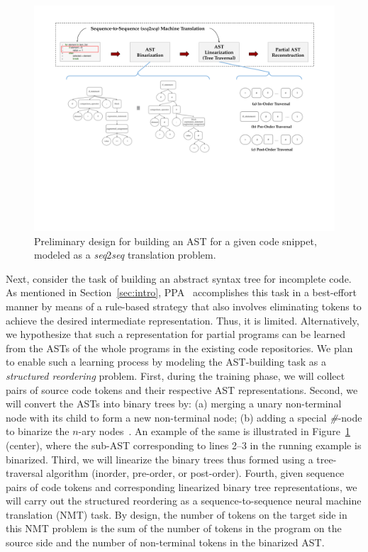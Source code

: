 \begin{figure}[h]
    \centering
    \includegraphics[width=\textwidth]{figures/seq2seq_2.png}
    \vspace{-135pt}
    \caption{Preliminary design for building an AST for a given code snippet, modeled as a \textit{seq}2\textit{seq} translation problem.}
    \label{fig:ast-bt-mapping}
\end{figure}

Next, consider the task of building an abstract syntax tree for incomplete code. As mentioned in Section~\ref{sec:intro}, PPA~\cite{ppa08} accomplishes this task in a best-effort manner by means of a rule-based strategy that also involves eliminating tokens to achieve the desired intermediate representation. Thus, it is limited. Alternatively, we hypothesize that such a representation for partial programs can be learned from the ASTs of the whole programs in the existing code repositories. We plan to enable such a learning process by modeling the AST-building task as a {\em structured reordering} problem. First, during the training phase, we will collect pairs of source code tokens and their respective AST representations. Second, we will convert the ASTs into binary trees by: (a) merging a unary non-terminal node with its child to form a new non-terminal node; (b) adding a special {\em \#}-node to binarize the $n$-ary nodes~\cite{https://doi.org/10.48550/arxiv.2206.11719}. An example of the same is illustrated in Figure~\ref{fig:ast-bt-mapping} (center), where the sub-AST corresponding to lines 2--3 in the running example is binarized. Third, we will linearize the binary trees thus formed using a tree-traversal algorithm (inorder, pre-order, or post-order). Fourth, given sequence pairs of code tokens and corresponding linearized binary tree representations, we will carry out the structured reordering as a sequence-to-sequence neural machine translation (NMT) task. By design, the number of tokens on the target side in this NMT problem is the sum of the number of tokens in the program on the source side and the number of non-terminal tokens in the binarized AST.




